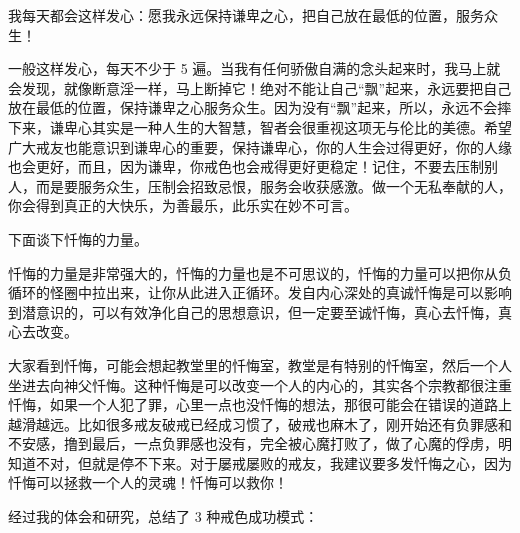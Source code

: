我每天都会这样发心：愿我永远保持谦卑之心，把自己放在最低的位置，服务众生！

一般这样发心，每天不少于 5 遍。当我有任何骄傲自满的念头起来时，我马上就会发现，就像断意淫一样，马上断掉它！绝对不能让自己“飘”起来，永远要把自己放在最低的位置，保持谦卑之心服务众生。因为没有“飘”起来，所以，永远不会摔下来，谦卑心其实是一种人生的大智慧，智者会很重视这项无与伦比的美德。希望广大戒友也能意识到谦卑心的重要，保持谦卑心，你的人生会过得更好，你的人缘也会更好，而且，因为谦卑，你戒色也会戒得更好更稳定！记住，不要去压制别人，而是要服务众生，压制会招致忌恨，服务会收获感激。做一个无私奉献的人，你会得到真正的大快乐，为善最乐，此乐实在妙不可言。

下面谈下忏悔的力量。

忏悔的力量是非常强大的，忏悔的力量也是不可思议的，忏悔的力量可以把你从负循环的怪圈中拉出来，让你从此进入正循环。发自内心深处的真诚忏悔是可以影响到潜意识的，可以有效净化自己的思想意识，但一定要至诚忏悔，真心去忏悔，真心去改变。

大家看到忏悔，可能会想起教堂里的忏悔室，教堂是有特别的忏悔室，然后一个人坐进去向神父忏悔。这种忏悔是可以改变一个人的内心的，其实各个宗教都很注重忏悔，如果一个人犯了罪，心里一点也没忏悔的想法，那很可能会在错误的道路上越滑越远。比如很多戒友破戒已经成习惯了，破戒也麻木了，刚开始还有负罪感和不安感，撸到最后，一点负罪感也没有，完全被心魔打败了，做了心魔的俘虏，明知道不对，但就是停不下来。对于屡戒屡败的戒友，我建议要多发忏悔之心，因为忏悔可以拯救一个人的灵魂！忏悔可以救你！

经过我的体会和研究，总结了 3 种戒色成功模式：

